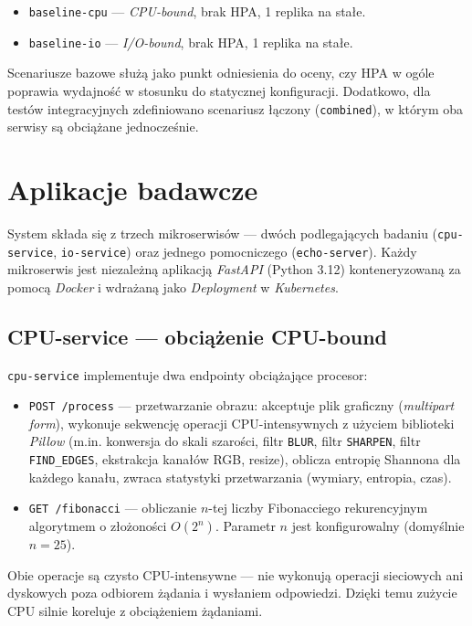 \begin{itemize}
  \item \texttt{baseline-cpu} — \textit{CPU-bound}, brak HPA, 1 replika na stałe.
  \item \texttt{baseline-io} — \textit{I/O-bound}, brak HPA, 1 replika na stałe.
\end{itemize}

Scenariusze bazowe służą jako punkt odniesienia do oceny, czy HPA w ogóle poprawia wydajność w stosunku do statycznej konfiguracji. Dodatkowo, dla testów integracyjnych zdefiniowano scenariusz łączony (\texttt{combined}), w którym oba serwisy są obciążane jednocześnie.

\section{Aplikacje badawcze}

System składa się z trzech mikroserwisów — dwóch podlegających badaniu (\texttt{cpu-service}, \texttt{io-service}) oraz jednego pomocniczego (\texttt{echo-server}). Każdy mikroserwis jest niezależną aplikacją \textit{FastAPI} (Python 3.12) konteneryzowaną za pomocą \textit{Docker} i wdrażaną jako \textit{Deployment} w \textit{Kubernetes}.

\subsection{CPU-service — obciążenie CPU-bound}

\texttt{cpu-service} implementuje dwa endpointy obciążające procesor:

\begin{itemize}
  \item \texttt{POST /process} — przetwarzanie obrazu: akceptuje plik graficzny (\textit{multipart form}), wykonuje sekwencję operacji CPU-intensywnych z użyciem biblioteki \textit{Pillow} (m.in. konwersja do skali szarości, filtr \texttt{BLUR}, filtr \texttt{SHARPEN}, filtr \texttt{FIND\_EDGES}, ekstrakcja kanałów RGB, resize), oblicza entropię Shannona dla każdego kanału, zwraca statystyki przetwarzania (wymiary, entropia, czas).
  \item \texttt{GET /fibonacci} — obliczanie $n$-tej liczby Fibonacciego rekurencyjnym algorytmem o złożoności $O(2^{n})$. Parametr $n$ jest konfigurowalny (domyślnie $n = 25$).
\end{itemize}

Obie operacje są czysto CPU-intensywne — nie wykonują operacji sieciowych ani dyskowych poza odbiorem żądania i wysłaniem odpowiedzi. Dzięki temu zużycie CPU silnie koreluje z obciążeniem żądaniami.

